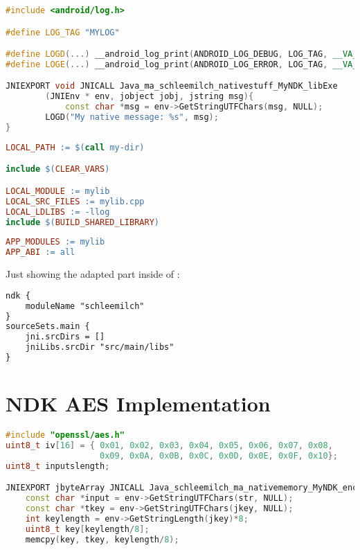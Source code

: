 \begin{appendices}
\begin{lstlisting}[language=C++, caption=mylib.cpp, label=nkd_sample_cpp]
#include <android/log.h>

#define LOG_TAG "MYLOG"

#define LOGD(...) __android_log_print(ANDROID_LOG_DEBUG, LOG_TAG, __VA_ARGS__)
#define LOGE(...) __android_log_print(ANDROID_LOG_ERROR, LOG_TAG, __VA_ARGS__)

JNIEXPORT void JNICALL Java_ma_schleemilch_nativestuff_MyNDK_libExe
        (JNIEnv * env, jobject jobj, jstring msg){
        	const char *msg = env->GetStringUTFChars(msg, NULL);
        LOGD("My native message: %s", msg);
}
\end{lstlisting}

\begin{lstlisting}[language=make, caption=Android.mk, label=nkd_sample_make]
LOCAL_PATH := $(call my-dir)

include $(CLEAR_VARS)

LOCAL_MODULE := mylib
LOCAL_SRC_FILES := mylib.cpp
LOCAL_LDLIBS := -llog
include $(BUILD_SHARED_LIBRARY)
\end{lstlisting}

\begin{lstlisting}[language=make, caption=Application.mk, label=nkd_sample_app_make]
APP_MODULES := mylib
APP_ABI := all
\end{lstlisting}

Just showing the adapted part inside of :
\begin{lstlisting}[language=xml, caption=build.gradle, label=nkd_sample_gradle]
ndk {
	moduleName "schleemilch"
}
sourceSets.main {
	jni.srcDirs = []
	jniLibs.srcDir "src/main/libs"
}
\end{lstlisting}


\chapter{NDK AES Implementation}\label{chapter:ndk_aes_implementation}
\begin{lstlisting}[language=C++, caption=AES Encrypt(), label=nkd_aes_encrypt]
#include "openssl/aes.h"
uint8_t iv[16] = { 0x01, 0x02, 0x03, 0x04, 0x05, 0x06, 0x07, 0x08,
                   0x09, 0x0A, 0x0B, 0x0C, 0x0D, 0x0E, 0x0F, 0x10};
uint8_t inputslength;

JNIEXPORT jbyteArray JNICALL Java_schleemilch_ma_nativememory_MyNDK_encrypt (JNIEnv *env, jobject obj, jstring str, jstring jkey){
    const char *input = env->GetStringUTFChars(str, NULL);
    const char *tkey = env->GetStringUTFChars(jkey, NULL);
    int keylength = env->GetStringLength(jkey)*8;
    uint8_t key[keylength/8];
    memcpy(key, tkey, keylength/8);


\end{lstlisting}
\end{appendices}
